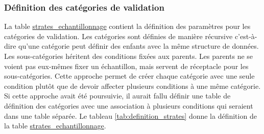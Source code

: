         \subsubsection{Définition des catégories de validation}
        La table \ul{strates\_echantillonnage} contient la définition des paramètres pour les catégories de validation. Les catégories sont définies de manière récursive c'est-à-dire qu'une catégorie peut définir des enfants avec la même structure de données. Les sous-catégories héritent des conditions fixées aux parents. Les parents ne se voient pas eux-mêmes fixer un échantillon, mais servent de réceptacle pour les sous-catégories. Cette approche permet de créer chaque catégorie avec une seule condition plutôt que de devoir affecter plusieurs conditions à une même catégorie. Si cette approche avait été poursuivie, il aurait fallu définir une table de définition des catégories avec une association à plusieurs conditions qui seraient dans une table séparée. Le tableau \ref{tab:definition_strates} donne la définition de la table \ul{strates\_echantillonnage}.
        \newcommand{\TitreTableStratesEch}{Colonnes pour la table \underline{strates\_echantillonnage}}
